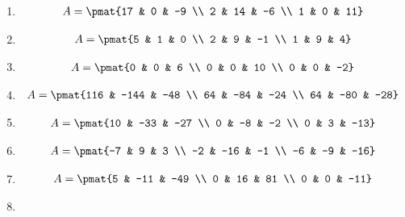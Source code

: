 \begin{enumerate}
\item

\begin{align*}
A = \pmat{17 & 0 & -9 \\ 2 & 14 & -6 \\ 1 & 0 & 11}
\end{align*}

\item

\begin{align*}
A = \pmat{5 & 1 & 0 \\ 2 & 9 & -1 \\ 1 & 9 & 4}
\end{align*}

\item

\begin{align*}
A = \pmat{0 & 0 & 6 \\ 0 & 0 & 10 \\ 0 & 0 & -2}
\end{align*}

\item

\begin{align*}
A = \pmat{116 & -144 & -48 \\ 64 & -84 & -24 \\ 64 & -80 & -28}
\end{align*}

\item

\begin{align*}
A = \pmat{10 & -33 & -27 \\ 0 & -8 & -2 \\ 0 & 3 & -13}
\end{align*}

\item

\begin{align*}
A = \pmat{-7 & 9 & 3 \\ -2 & -16 & -1 \\ -6 & -9 & -16}
\end{align*}

\item

\begin{align*}
A = \pmat{5 & -11 & -49 \\ 0 & 16 & 81 \\ 0 & 0 & -11}
\end{align*}

\item


\end{enumerate}
